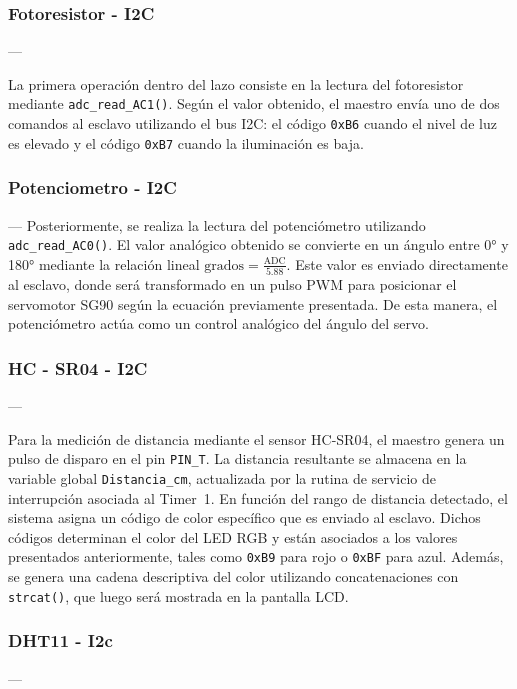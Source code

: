 \subsubsection{Fotoresistor - I2C} --- 

La primera operación dentro del lazo consiste en la lectura del fotoresistor mediante \texttt{adc\_read\_AC1()}. Según el valor obtenido, el maestro envía uno de dos comandos al esclavo utilizando el bus I2C: el código \texttt{0xB6} cuando el nivel de luz es elevado y el código \texttt{0xB7} cuando la iluminación es baja. 

\vspace{1em}
\subsubsection{Potenciometro - I2C} ---
Posteriormente, se realiza la lectura del potenciómetro utilizando \texttt{adc\_read\_AC0()}. El valor analógico obtenido se convierte en un ángulo entre 0° y 180° mediante la relación lineal \(\text{grados} = \frac{\text{ADC}}{5.88}\). Este valor es enviado directamente al esclavo, donde será transformado en un pulso PWM para posicionar el servomotor SG90 según la ecuación previamente presentada. De esta manera, el potenciómetro actúa como un control analógico del ángulo del servo.

\vspace{1em}
\subsubsection{HC - SR04 - I2C} ---

Para la medición de distancia mediante el sensor HC-SR04, el maestro genera un pulso de disparo en el pin \texttt{PIN\_T}. La distancia resultante se almacena en la variable global \texttt{Distancia\_cm}, actualizada por la rutina de servicio de interrupción asociada al Timer~1. En función del rango de distancia detectado, el sistema asigna un código de color específico que es enviado al esclavo. Dichos códigos determinan el color del LED RGB y están asociados a los valores presentados anteriormente, tales como \texttt{0xB9} para rojo o \texttt{0xBF} para azul. Además, se genera una cadena descriptiva del color utilizando concatenaciones con \texttt{strcat()}, que luego será mostrada en la pantalla LCD.

\vspace{1em}
\subsubsection{DHT11 - I2c} ---

